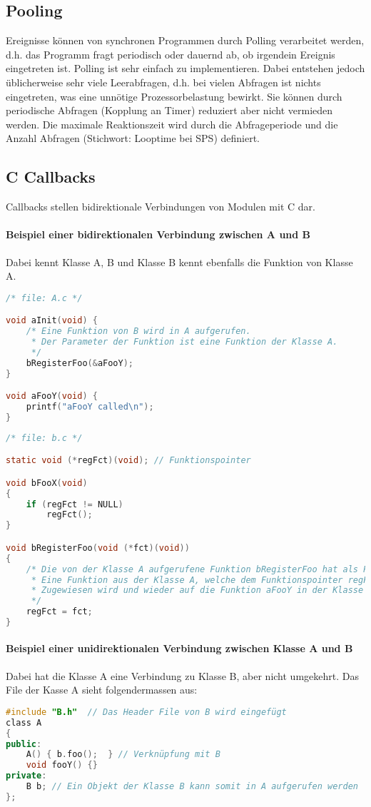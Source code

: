 \subsection{Pooling}
Ereignisse können von synchronen Programmen durch Polling verarbeitet werden, d.h. das Programm fragt periodisch oder dauernd ab, ob irgendein Ereignis eingetreten ist. Polling ist sehr einfach zu implementieren.
Dabei entstehen jedoch üblicherweise sehr viele Leerabfragen, d.h. bei vielen Abfragen ist nichts eingetreten, was eine unnötige Prozessorbelastung bewirkt. Sie können durch periodische Abfragen (Kopplung an Timer) reduziert aber nicht vermieden werden.
Die maximale Reaktionszeit wird durch die Abfrageperiode und die Anzahl Abfragen (Stichwort: Looptime bei SPS) definiert.

\subsection{C Callbacks}
Callbacks stellen bidirektionale Verbindungen von Modulen mit C dar.

\paragraph{Beispiel einer bidirektionalen Verbindung zwischen A und B} 
 Dabei kennt Klasse A, B und Klasse B kennt ebenfalls die Funktion von Klasse A.
\begin{lstlisting}[language=c]
/* file: A.c */

void aInit(void) {
    /* Eine Funktion von B wird in A aufgerufen.
     * Der Parameter der Funktion ist eine Funktion der Klasse A.
     */
    bRegisterFoo(&aFooY);  
}

void aFooY(void) {
    printf("aFooY called\n");
}
\end{lstlisting}
\begin{lstlisting}[language=c]
/* file: b.c */

static void (*regFct)(void); // Funktionspointer

void bFooX(void)
{
    if (regFct != NULL)
        regFct();
}

void bRegisterFoo(void (*fct)(void))
{
    /* Die von der Klasse A aufgerufene Funktion bRegisterFoo hat als Parameter
     * Eine Funktion aus der Klasse A, welche dem Funktionspointer regFct
     * Zugewiesen wird und wieder auf die Funktion aFooY in der Klasse A zeigt.
     */
    regFct = fct;
}
\end{lstlisting}


\paragraph{Beispiel einer unidirektionalen Verbindung zwischen Klasse A und B}
Dabei hat die Klasse A eine Verbindung zu Klasse B, aber nicht umgekehrt. Das File der Kasse A sieht folgendermassen aus: 
\begin{lstlisting}[language=c++]
#include "B.h"  // Das Header File von B wird eingefügt
class A
{
public:
    A() { b.foo();  } // Verknüpfung mit B
    void fooY() {}
private:
    B b; // Ein Objekt der Klasse B kann somit in A aufgerufen werden
};
\end{lstlisting}

